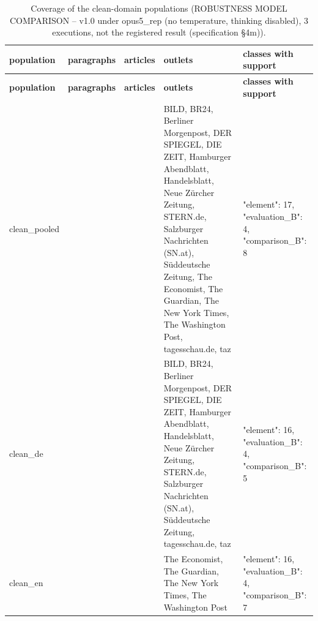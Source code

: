 \begingroup\footnotesize
\begin{longtable}{>{\raggedright\arraybackslash}p{66.8pt}>{\raggedright\arraybackslash}p{65.6pt}>{\raggedright\arraybackslash}p{52.9pt}>{\raggedright\arraybackslash}p{120.6pt}>{\raggedright\arraybackslash}p{89.2pt}}
\caption{Coverage of the clean-domain populations (ROBUSTNESS MODEL COMPARISON -- v1.0 under opus5\_\allowbreak{}rep (no temperature, thinking disabled), 3 executions, not the registered result (specification §4m)).} \\
\toprule
\textbf{population} & \textbf{paragraphs} & \textbf{articles} & \textbf{outlets} & \textbf{classes with support} \\
\midrule
\endfirsthead
\toprule
\textbf{population} & \textbf{paragraphs} & \textbf{articles} & \textbf{outlets} & \textbf{classes with support} \\
\midrule
\endhead
\bottomrule
\endfoot
clean\_\allowbreak{}pooled & 105 & 50 & BILD, BR24, Berliner Morgenpost, DER SPIEGEL, DIE ZEIT, Hamburger Abendblatt, Handelsblatt, Neue Zürcher Zeitung, STERN.de, Salzburger Nachrichten (SN.at), Süddeutsche Zeitung, The Economist, The Guardian, The New York Times, The Washington Post, tagesschau.de, taz & {"element":\allowbreak{} 17, "evaluation\_\allowbreak{}B":\allowbreak{} 4, "comparison\_\allowbreak{}B":\allowbreak{} 8} \\
clean\_\allowbreak{}de & 49 & 24 & BILD, BR24, Berliner Morgenpost, DER SPIEGEL, DIE ZEIT, Hamburger Abendblatt, Handelsblatt, Neue Zürcher Zeitung, STERN.de, Salzburger Nachrichten (SN.at), Süddeutsche Zeitung, tagesschau.de, taz & {"element":\allowbreak{} 16, "evaluation\_\allowbreak{}B":\allowbreak{} 4, "comparison\_\allowbreak{}B":\allowbreak{} 5} \\
clean\_\allowbreak{}en & 56 & 26 & The Economist, The Guardian, The New York Times, The Washington Post & {"element":\allowbreak{} 16, "evaluation\_\allowbreak{}B":\allowbreak{} 4, "comparison\_\allowbreak{}B":\allowbreak{} 7} \\
\end{longtable}
\endgroup
